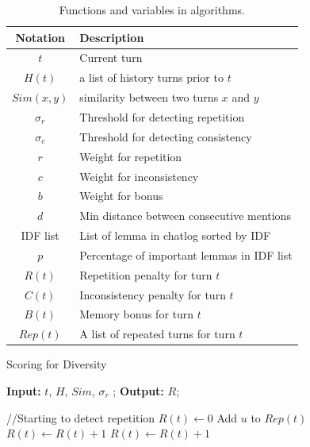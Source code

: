 \begin{table}[th]
\centering
\small
\begin{tabular}{c|l}
\toprule
\textbf{Notation} & \textbf{Description} \\ \midrule
$t$ & Current turn \\
$H(t)$  &  a list of history turns prior to $t$ \\
$Sim(x,y)$ & similarity between two turns $x$ and $y$ \\
$\sigma_r$ & Threshold for detecting repetition \\
$\sigma_c$ & Threshold for detecting consistency \\
$r$ & Weight for repetition \\
$c$ & Weight for inconsistency \\
$b$ & Weight for bonus \\
$d$ & Min distance between consecutive mentions \\
IDF list & List of lemma in chatlog sorted by IDF\\
$p$ & Percentage of important lemmas in IDF list\\
$R(t)$ &  Repetition penalty for turn $t$ \\
$C(t)$ &  Inconsistency penalty for turn $t$ \\ 
$B(t)$ &  Memory bonus for turn $t$ \\
$Rep(t)$ & A list of repeated turns for turn $t$ \\  
\bottomrule
\end{tabular}
\caption{
Functions and variables in algorithms.}
\label{tab:functions}
\end{table}

\begin{algorithm}[th]
\small
\caption{Scoring for Diversity}
\label{algo:rep}
\hspace*{0.02in} {\bf Input:}
 $t$, $H$, $Sim$, $\sigma_{r}$
; \hspace*{0.02in} {\bf Output: } 
 $R$;
\begin{algorithmic}[1]
\State //Starting to detect repetition
\State $R(t) \leftarrow 0$
		\State Add $u$ to $Rep(t)$
	\EndIf
\EndFor
        \State $ R(t) \leftarrow  R(t) + 1$ 
        \Else
        \State $R(t) \leftarrow R(t) + 1$ 
        \EndIf
        \EndIf
    \EndIf
\end{algorithmic}
\end{algorithm}


